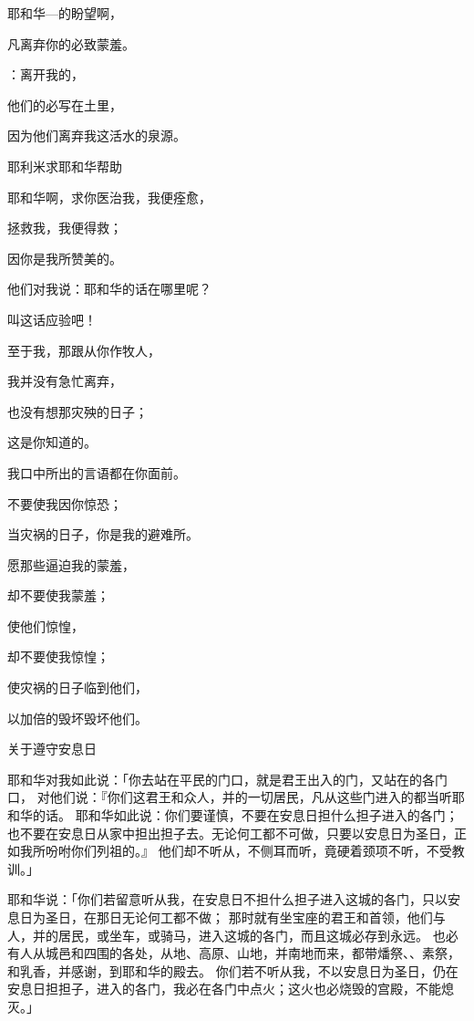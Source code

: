 {\par }{\Q {}耶和华—{}的盼望啊，
\par }{\Q 凡离弃你的必致蒙羞。
\par }{：离开我的，
\par }{\Q 他们的{}必写在土里，
\par }{\Q 因为他们离弃我这活水的泉源。
\par }{\SH 耶利米求耶和华帮助
\par }{\Q {}耶和华啊，求你医治我，我便痊愈，
\par }{\Q 拯救我，我便得救；
\par }{\Q 因你是我所赞美的。
\par }{\Q {}他们对我说：耶和华的话在哪里呢？
\par }{\Q 叫这话应验吧！
\par }{\Q {}至于我，那跟从你作牧人{}，
\par }{\Q 我并没有急忙离弃，
\par }{\Q 也没有想那灾殃的日子；
\par }{\Q 这是你知道的。
\par }{\Q 我口中所出的言语都在你面前。
\par }{\Q {}不要使我因你惊恐；
\par }{\Q 当灾祸的日子，你是我的避难所。
\par }{\Q {}愿那些逼迫我的蒙羞，
\par }{\Q 却不要使我蒙羞；
\par }{\Q 使他们惊惶，
\par }{\Q 却不要使我惊惶；
\par }{\Q 使灾祸的日子临到他们，
\par }{\Q 以加倍的毁坏毁坏他们。
\par }{\SH 关于遵守安息日
\par }{\PP {}耶和华对我如此说：「你去站在平民的门口，就是{}君王出入的门，又站在{}的各门口，
对他们说：『你们这{}君王和{}众人，并{}的一切居民，凡从这些门进入的都当听耶和华的话。
耶和华如此说：你们要谨慎，不要在安息日担什么担子进入{}的各门；
也不要在安息日从家中担出担子去。无论何工都不可做，只要以安息日为圣日，正如我所吩咐你们列祖的。』
他们却不听从，不侧耳而听，竟硬着颈项不听，不受教训。」
\par }{\PP {}耶和华说：「你们若留意听从我，在安息日不担什么担子进入这城的各门，只以安息日为圣日，在那日无论何工都不做；
那时就有坐{}宝座的君王和首领，他们与{}人，并{}的居民，或坐车，或骑马，进入这城的各门，而且这城必存到永远。
也必有人从{}城邑和{}四围的各处，从{}地、高原、山地，并南地而来，都带燔祭、{}、素祭，和乳香，并感谢{}，到耶和华的殿去。
你们若不听从我，不以安息日为圣日，仍在安息日担担子，进入{}的各门，我必在各门中点火；这火也必烧毁{}的宫殿，不能熄灭。」

}
